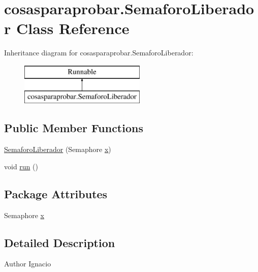 \hypertarget{classcosasparaprobar_1_1_semaforo_liberador}{}\section{cosasparaprobar.\+Semaforo\+Liberador Class Reference}
\label{classcosasparaprobar_1_1_semaforo_liberador}
Inheritance diagram for cosasparaprobar.\+Semaforo\+Liberador\+:\begin{figure}[H]
\begin{center}
\leavevmode
\includegraphics[height=2.000000cm]{classcosasparaprobar_1_1_semaforo_liberador}
\end{center}
\end{figure}
\subsection*{Public Member Functions}
\begin{DoxyCompactItemize}
\item 
\mbox{\hyperlink{classcosasparaprobar_1_1_semaforo_liberador_a4b87cbb393e66de3dcc8727741649b11}{Semaforo\+Liberador}} (Semaphore \mbox{\hyperlink{classcosasparaprobar_1_1_semaforo_liberador_aa58c46d88298972b9a7ba1c78ff9ab30}{x}})
\item 
void \mbox{\hyperlink{classcosasparaprobar_1_1_semaforo_liberador_a1d5f1711aeb1522013e09fca54f4c4dd}{run}} ()
\end{DoxyCompactItemize}
\subsection*{Package Attributes}
\begin{DoxyCompactItemize}
\item 
Semaphore \mbox{\hyperlink{classcosasparaprobar_1_1_semaforo_liberador_aa58c46d88298972b9a7ba1c78ff9ab30}{x}}
\end{DoxyCompactItemize}


\subsection{Detailed Description}
\begin{DoxyAuthor}{Author}
Ignacio 
\end{DoxyAuthor}



